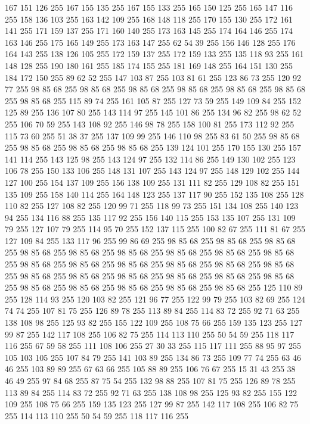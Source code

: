 167 151 126 255 167 155 135 255 167 155 133 255 165 150 125 255 165 147 116 255 158 136 103 255 163 142 109 255 168 148 118 255 170 155 130 255 172 161 141 255 171 159 137 255 171 160 140 255 173 163 145 255 174 164 146 255 174 163 146 255 175 165 149 255 173 163 147 255 62 54 39 255 156 146 128 255 176 164 143 255 138 126 105 255 172 159 137 255 172 159 133 255 135 118 93 255 161 148 128 255 190 180 161 255 185 174 155 255 181 169 148 255 164 151 130 255 184 172 150 255 89 62 52 255 147 103 87 255 103 81 61 255 123 86 73 255 120 92 77 255 98 85 68 255 98 85 68 255 98 85 68 255 98 85 68 255 98 85 68 255 98 85 68 255 98 85 68 255 115 89 74 255 161 105 87 255 127 73 59 255 149 109 84 255 152 125 89 255 136 107 80 255 143 114 97 255 145 101 86 255 134 96 82 255 98 62 52 255 106 70 59 255 143 108 92 255 146 98 78 255 158 100 81 255 173 112 92 255 115 73 60 255 51 38 37 255 137 109 99 255 146 110 98 255 83 61 50 255 98 85 68 255 98 85 68 255
98 85 68 255 98 85 68 255 139 124 101 255 170 155 130 255 157 141 114 255 143 125 98 255 143 124 97 255 132 114 86 255 149 130 102 255 123 106 78 255 150 133 106 255 148 131 107 255 143 124 97 255 148 129 102 255 144 127 100 255 154 137 109 255 156 138 109 255 131 111 82 255 129 108 82 255 151 135 109 255 158 140 114 255 164 148 123 255 137 117 90 255 152 135 108 255 128 110 82 255 127 108 82 255 120 99 71 255 118 99 73 255 151 134 108 255 140 123 94 255 134 116 88 255 135 117 92 255 156 140 115 255 153 135 107 255 131 109 79 255 127 107 79 255 114 95 70 255 152 137 115 255 100 82 67 255 111 81 67 255 127 109 84 255 133 117 96 255 99 86 69 255 98 85 68 255 98 85 68 255 98 85 68 255 98 85 68 255 98 85 68 255 98 85 68 255 98 85 68 255 98 85 68 255 98 85 68 255 98 85 68 255 98 85 68 255 98 85 68 255 98 85 68 255 98 85 68 255 98 85 68 255 98 85 68 255 98 85 68 255 98 85 68 255 98 85 68 255 98 85 68 255 98 85 68 255
98 85 68 255 98 85 68 255 98 85 68 255 98 85 68 255 98 85 68 255 125 110 89 255 128 114 93 255 120 103 82 255 121 96 77 255 122 99 79 255 103 82 69 255 124 74 74 255 107 81 75 255 126 89 78 255 113 89 84 255 114 83 72 255 92 71 63 255 138 108 98 255 125 93 82 255 155 122 109 255 108 75 66 255 159 135 123 255 127 99 87 255 142 117 108 255 106 82 75 255 114 113 110 255 50 54 59 255 118 117 116 255 67 59 58 255 111 108 106 255 27 30 33 255 115 117 111 255 88 95 97 255 105 103 105 255 107 84 79 255 141 103 89 255 134 86 73 255 109 77 74 255 63 46 46 255 103 89 89 255 67 63 66 255 105 88 89 255 106 76 67 255 15 31 43 255 38 46 49 255 97 84 68 255 87 75 54 255 132 98 88 255 107 81 75 255 126 89 78 255 113 89 84 255 114 83 72 255 92 71 63 255 138 108 98 255 125 93 82 255 155 122 109 255 108 75 66 255 159 135 123 255 127 99 87 255 142 117 108 255 106 82 75 255 114 113 110 255 50 54 59 255 118 117 116 255

